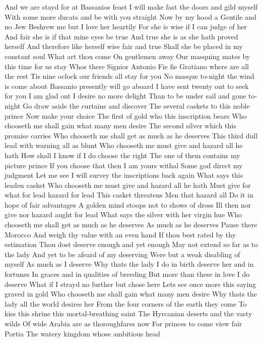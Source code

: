 And we are stayd for at Bassanios feast
I will make fast the doors and gild myself
With some more ducats and be with you straight
Now by my hood a Gentile and no Jew
Beshrew me but I love her heartily
For she is wise if I can judge of her
And fair she is if that mine eyes be true
And true she is as she hath proved herself
And therefore like herself wise fair and true
Shall she be placed in my constant soul
What art thou come On gentlemen away
Our masquing mates by this time for us stay
Whos there
Signior Antonio
Fie fie Gratiano where are all the rest
Tis nine oclock our friends all stay for you
No masque to-night the wind is come about
Bassanio presently will go aboard
I have sent twenty out to seek for you
I am glad ont I desire no more delight
Than to be under sail and gone to-night
Go draw aside the curtains and discover
The several caskets to this noble prince
Now make your choice
The first of gold who this inscription bears
Who chooseth me shall gain what many men desire
The second silver which this promise carries
Who chooseth me shall get as much as he deserves
This third dull lead with warning all as blunt
Who chooseth me must give and hazard all he hath
How shall I know if I do choose the right
The one of them contains my picture prince
If you choose that then I am yours withal
Some god direct my judgment Let me see
I will survey the inscriptions back again
What says this leaden casket
Who chooseth me must give and hazard all he hath
Must give for what for lead hazard for lead
This casket threatens Men that hazard all
Do it in hope of fair advantages
A golden mind stoops not to shows of dross
Ill then nor give nor hazard aught for lead
What says the silver with her virgin hue
Who chooseth me shall get as much as he deserves
As much as he deserves Pause there Morocco
And weigh thy value with an even hand
If thou best rated by thy estimation
Thou dost deserve enough and yet enough
May not extend so far as to the lady
And yet to be afeard of my deserving
Were but a weak disabling of myself
As much as I deserve Why thats the lady
I do in birth deserve her and in fortunes
In graces and in qualities of breeding
But more than these in love I do deserve
What if I strayd no further but chose here
Lets see once more this saying graved in gold
Who chooseth me shall gain what many men desire
Why thats the lady all the world desires her
From the four corners of the earth they come
To kiss this shrine this mortal-breathing saint
The Hyrcanian deserts and the vasty wilds
Of wide Arabia are as thoroughfares now
For princes to come view fair Portia
The watery kingdom whose ambitious head
